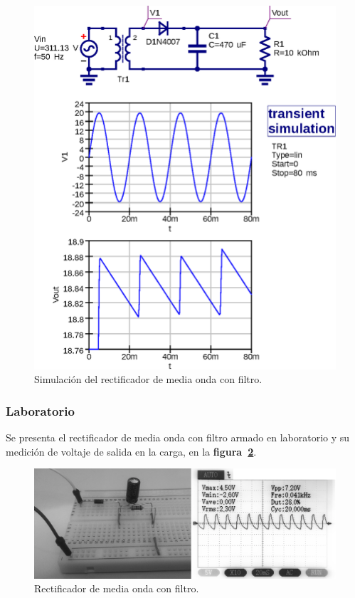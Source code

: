 \begin{figure}[!h]
\centering
\includegraphics[scale=0.75]{simulacion/05.media_onda2.eps}
\caption{Simulación del rectificador de media onda con filtro.}
\label{simulacion05}
\end{figure}

\subsubsection{Laboratorio}
Se presenta el rectificador de media onda con filtro armado en laboratorio y su
medición de voltaje de salida en la carga, en la
\textbf{figura~\ref{laboratorio07}}.

\begin{figure}[!h]
\centering
\includegraphics[scale=0.34]{fotos/05.media_onda2.eps}
\caption{Rectificador de media onda con filtro.}
\label{laboratorio07}
\end{figure}

